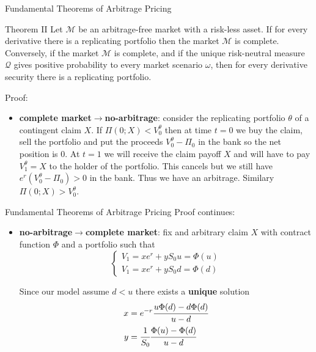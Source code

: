 \documentclass{beamer}
\begin{document}
\begin{frame}{Fundamental Theorems of Arbitrage Pricing}
	\begin{block}{Theorem II}
		Let $\mathcal{M}$ be an arbitrage-free market with a risk-less asset. If for every derivative there is a replicating portfolio %
		then the market $\mathcal{M}$ is complete. Conversely, if the market $\mathcal{M}$ is complete, and if the unique risk-neutral measure $\mathcal{Q}$ gives positive probability to every market scenario $\omega$, then for every derivative security there is a replicating portfolio.%
	\end{block}
	Proof:
	\begin{itemize}
		\item \textbf{complete market$\rightarrow$no-arbitrage}: consider the replicating portfolio $\theta$ of a contingent claim $X$. If $\Pi(0; X) < V_0^\theta$ then at time $t=0$ we buy the claim, sell the portfolio and put the proceeds $V_0^\theta-\Pi_0$ in the bank so the net position is 0. At $t=1$ we will receive the claim payoff $X$ and will have to pay $V_1^\theta =X$  to the holder of the portfolio. This cancels but we still have $e^r(V_0^\theta-\Pi_0)>0$ in the bank. Thus we have an arbitrage. Similary $\Pi(0; X) > V_0^\theta$.
	\end{itemize}
\end{frame}

\begin{frame}{Fundamental Theorems of Arbitrage Pricing}
	Proof continues:
	\begin{itemize}
		\item \textbf{no-arbitrage$\rightarrow$complete market}: fix and arbitrary claim $X$ with contract function $\Phi$ and a portfolio such that
		\begin{equation*}
			\begin{cases}
				V_1 = x e^r + yS_0u = \Phi(u)\\
				V_1 = x e^r + yS_0d = \Phi(d)
			\end{cases}
		\end{equation*}
		
		Since our model assume $d<u$ there exists a \textbf{unique} solution
		\begin{equation}
			\begin{aligned}
				x &= e^{-r}\cfrac{u\Phi(d)-d\Phi(d)}{u-d} \\
				y &= \cfrac{1}{S_0}\cfrac{\Phi(u)-\Phi(d)}{u-d}
			\end{aligned}
		\label{eq:replica_portfolio_value}
		\end{equation}
	\end{itemize}
\end{frame}
\end{document}
